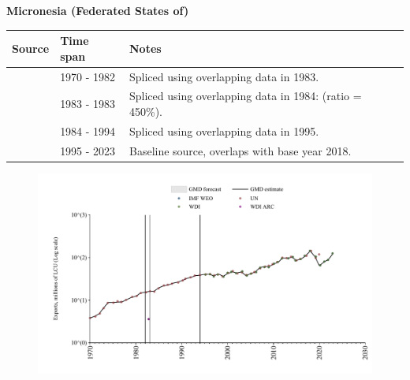 \documentclass[12pt,a4paper,landscape]{article}
\begin{document}
\begin{adjustbox}{max totalsize={\paperwidth}{\paperheight},center}
\begin{minipage}[t][\textheight][t]{\textwidth}
\vspace*{0.5cm}
{}
\begin{center}
{\Large\bfseries Micronesia (Federated States of)}
\end{center}
\vspace{0.5cm}
\begin{table}[H]
\centering
\small
\begin{tabular}{|l|l|l|}
\hline
\textbf{Source} & \textbf{Time span} & \textbf{Notes} \\
\hline
\rowcolor{white}\cite{UN}& 1970 - 1982 &Spliced using overlapping data in 1983.\\
\rowcolor{lightgray}\cite{WDI}& 1983 - 1983 &Spliced using overlapping data in 1984: (ratio = 450\%).\\
\rowcolor{white}\cite{UN}& 1984 - 1994 &Spliced using overlapping data in 1995.\\
\rowcolor{lightgray}\cite{WDI}& 1995 - 2023 &Baseline source, overlaps with base year 2018.\\
\hline
\end{tabular}
\end{table}
\begin{figure}[H]
\centering
\includegraphics[width=\textwidth,height=0.6\textheight,keepaspectratio]{graphs/FSM_exports.pdf}
\end{figure}
\end{minipage}
\end{adjustbox}
\end{document}
